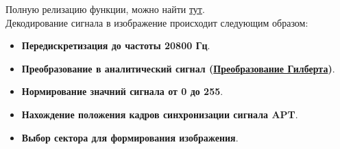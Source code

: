 \documentclass[a4paper, 14pt, titlepage, fleqn]{extarticle}
\begin{document}
	\noindent Полную релизацию функции, можно найти \href{...}{тут}. \\
	
	\noindent Декодирование сигнала в изображение происходит следующим образом:
	
	\begin{itemize}
		\item \textbf{Передискретизация до частоты 20800 Гц}.
		\item \textbf{Преобразование в аналитический сигнал (\href{https://en.wikipedia.org/wiki/Hilbert_transform}{Преобразование Гилберта})}.
		\item \textbf{Нормирование значний сигнала от 0 до 255}.
		\item \textbf{Нахождение положения кадров синхронизации сигнала APT}.
		\item \textbf{Выбор сектора для формирования изображения}.
	\end{itemize}
	
\end{document}
